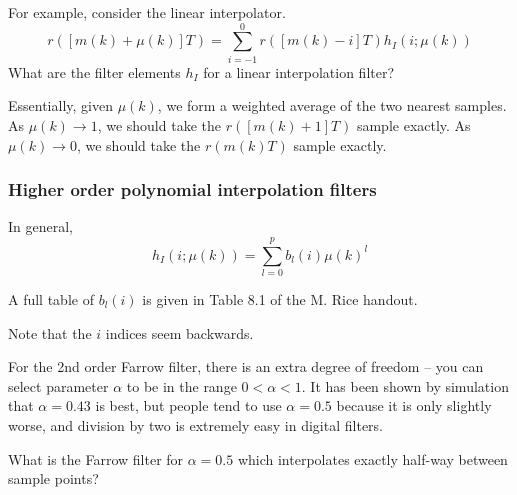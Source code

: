   For example,
consider the linear interpolator.
\[
  r([m(k) + \mu(k)]T_{}) = \sum_{i=-1}^0 r([m(k)-i]T_{}) h_I(i; \mu(k))
\]
What are the filter elements $h_I$ for a linear interpolation
filter?


Essentially, given $\mu(k)$, we form a weighted average of the two
nearest samples.  As $\mu(k)\rightarrow 1$, we should take the
$r([m(k)+1]T_{})$ sample exactly.  As $\mu(k)\rightarrow 0$, we
should take the $r(m(k)T_{})$ sample exactly.

\subsubsection{Higher order polynomial interpolation filters}

In general,
\[
  h_I(i; \mu(k)) = \sum_{l=0}^p b_l(i) \mu(k)^l
\]

A full table of $b_l(i)$ is given in Table 8.1 of the M. Rice
handout.

Note that the $i$ indices seem backwards.

For the 2nd order Farrow filter, there is an extra degree of freedom
-- you can select parameter $\alpha$ to be in the range $0 < \alpha
< 1$.  It has been shown by simulation that $\alpha=0.43$ is best,
but people tend to use $\alpha = 0.5$ because it is only slightly
worse, and division by two is extremely easy in digital filters.

  What is the Farrow filter for
$\alpha = 0.5$ which interpolates exactly half-way between sample
points?


